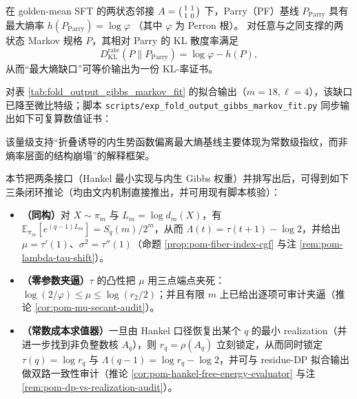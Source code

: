 \begin{remark}\label{rem:pom-gibbs-parry-entropy-gap}
在 golden-mean SFT 的两状态邻接
\(
A=\begin{psmallmatrix}1&1\\[2pt]1&0\end{psmallmatrix}
\)
下，Parry（PF）基线 \(P_{\mathrm{Parry}}\) 具有最大熵率
\(
h(P_{\mathrm{Parry}})=\log\varphi
\)
（其中 \(\varphi\) 为 Perron 根）。
对任意与之同支撑的两状态 Markov 规格 \(P\)，其相对 Parry 的 KL 散度率满足
\[
D_{\mathrm{KL}}^{\mathrm{rate}}(P\|P_{\mathrm{Parry}})=\log\varphi-h(P),
\]
从而“最大熵缺口”可等价输出为一份 KL-率证书。
\par
对表 \ref{tab:fold_output_gibbs_markov_fit} 的拟合输出（\(m=18,\ell=4\)），该缺口已降至微比特级；脚本 \texttt{scripts/exp\_fold\_output\_gibbs\_markov\_fit.py} 同步输出如下可复算数值证书：

该量级支持“折叠诱导的内生势函数偏离最大熵基线主要体现为常数级指纹，而非熵率层面的结构崩塌”的解释框架。
\end{remark}

\begin{remark}\label{rem:pom-interface-loop-collision-loss}
本节把两条接口（Hankel 最小实现与内生 Gibbs 权重）并排写出后，可得到如下三条闭环推论（均由文内机制直接推出，并可用现有脚本核验）：
\begin{itemize}
  \item \textbf{（同构）}对 \(X\sim\pi_m\) 与 \(L_m=\log d_m(X)\)，有
  \(\mathbb{E}_{\pi_m}[e^{(q-1)L_m}]=S_q(m)/2^m\)，从而 \(\Lambda(t)=\tau(t+1)-\log2\)，并给出 \(\mu=\tau'(1)\)、\(\sigma^2=\tau''(1)\)（命题 \ref{prop:pom-fiber-index-cgf} 与注 \ref{rem:pom-lambda-tau-shift}）。
  \item \textbf{（零参数夹逼）}\(\tau\) 的凸性把 \(\mu\) 用三点端点夹死：\(\log(2/\varphi)\le \mu\le \log(r_2/2)\)；并且有限 \(m\) 上已给出逐项可审计夹逼（推论 \ref{cor:pom-mu-secant-audit}）。
  \item \textbf{（常数成本求值器）}一旦由 Hankel 口径恢复出某个 \(q\) 的最小 realization（并进一步找到非负整数核 \(A_q\)），则 \(r_q=\rho(A_q)\) 立刻锁定，从而同时锁定 \(\tau(q)=\log r_q\) 与 \(\Lambda(q-1)=\log r_q-\log2\)，并可与 residue-DP 拟合输出做双路一致性审计（推论 \ref{cor:pom-hankel-free-energy-evaluator} 与注 \ref{rem:pom-dp-vs-realization-audit}）。
\end{itemize}
\end{remark}
